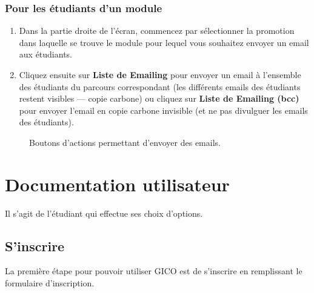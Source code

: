 \documentclass[letterpaper,10pt,french]{sphinxmanual}
\begin{document}
\subsection{Pour les étudiants d'un module}
\label{prof:pour-les-etudiants-d-un-module}\begin{enumerate}
\item {} 
Dans la partie droite de l'écran, commencez par sélectionner la promotion dans laquelle se trouve le module pour lequel vous souhaitez envoyer un email aux étudiants.

\item {} 
Cliquez ensuite sur \textbf{Liste de Emailing} pour envoyer un email à l'ensemble des étudiants du parcours correspondant (les différents emails des étudiants restent visibles — copie carbone) ou cliquez sur \textbf{Liste de Emailing (bcc)} pour envoyer l'email en copie carbone invisible (et ne pas divulguer les emails des étudiants).

\end{enumerate}
\begin{figure}[htbp]
\centering
\capstart

\caption{Boutons d'actions permettant d'envoyer des emails.}\end{figure}


\chapter{Documentation utilisateur}
\label{index:documentation-utilisateur}
Il s'agit de l'étudiant qui effectue ses choix d'options.


\section{S'inscrire}
\label{etudiant:s-inscrire}\label{etudiant::doc}
La première étape pour pouvoir utiliser GICO est de s'inscrire en remplissant le formulaire d'inscription.
\end{document}

